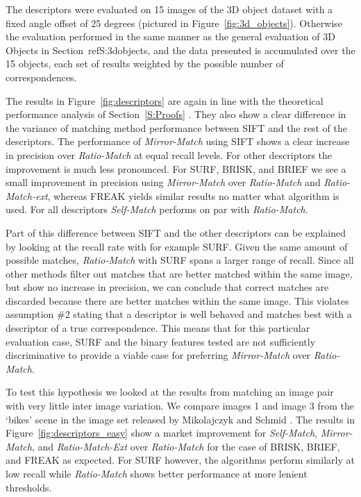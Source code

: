 \documentclass[10pt,journal,cspaper,compsoc]{IEEEtran}
\begin{document}
The descriptors were evaluated on 15 images of the 3D object dataset 
with a fixed angle offset of 25 degrees (pictured in 
Figure~\ref{fig:3d_objects}).  Otherwise the evaluation performed in the same manner as
the general evaluation of 3D Objects in Section~ref{S:3dobjects}, and the data presented is 
accumulated over the 15 objects, each set of results weighted by the 
possible number of correspondences.

The results in Figure~\ref{fig:descriptors} are again in line with the theoretical performance analysis of Section~\ref{S:Proofs} .
They also show a clear difference in the variance of matching method 
performance between SIFT and the rest of the descriptors. The 
performance of \emph{Mirror-Match} using SIFT shows a clear increase in 
precision over \emph{Ratio-Match} at equal recall levels. For other 
descriptors the improvement is much less pronounced.  For SURF, BRISK, 
and BRIEF we see a small improvement in precision using 
\emph{Mirror-Match} over \emph{Ratio-Match} and \emph{Ratio-Match-ext}, 
whereas FREAK yields similar results no matter what algorithm is used.  
For all descriptors \emph{Self-Match} performs on par with 
\emph{Ratio-Match}.

Part of this difference between SIFT and the 
other descriptors can be explained by looking at the recall rate 
with for example SURF\@. Given the same amount of possible matches, 
\emph{Ratio-Match} with SURF spans a larger range of recall.  
Since all other methods filter out matches that are better matched 
within the same image, but show no increase in precision, we can conclude 
that correct matches are discarded because there are better matches 
within the same image. This violates assumption \#2 stating that a 
descriptor is well behaved and matches best with a descriptor of a true 
correspondence. This means that for this particular evaluation case, SURF 
and the binary features tested are not sufficiently discriminative to 
provide a viable case for preferring \emph{Mirror-Match} over 
\emph{Ratio-Match}.

To test this hypothesis we looked at the results from matching an image 
pair with very little inter image variation. We compare images 1 and 
image 3 from the `bikes' scene in the image set released by Mikolajczyk 
and Schmid \cite{mikolajczyk2005performance}. The results 
in Figure~\ref{fig:descriptors_easy} show a market improvement for 
\emph{Self-Match}, \emph{Mirror-Match}, and \emph{Ratio-Match-Ext} over 
\emph{Ratio-Match} for the case of BRISK, BRIEF, and FREAK as expected.  
For SURF however, the algorithms perform similarly at low recall while 
\emph{Ratio-Match} shows better performance at more lenient thresholds.
\end{document}
